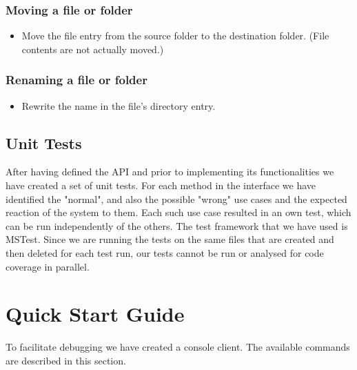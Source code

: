 \documentclass[11pt]{article}
\begin{document}
\subsubsection{Moving a file or folder}\label{moving-a-file-or-folder}
    \begin{itemize}
        \itemsep1pt\parskip0pt
        \item{Move the file entry from the source folder to the destination folder. (File contents are not actually moved.)}
    \end{itemize}

\subsubsection{Renaming a file or folder}\label{renaming-a-file-or-folder}
    \begin{itemize}
        \itemsep1pt\parskip0pt
        \item{Rewrite the name in the file's directory entry.}
    \end{itemize}

\subsection{Unit Tests}
After having defined the API and prior to implementing its functionalities we have created a set of unit tests. For each method in the interface we have identified the "normal", and also the possible "wrong" use cases and the expected reaction of the system to them. Each such use case resulted in an own test, which can be run independently of the others. The test framework that we have used is MSTest.\newline
Since we are running the tests on the same files that are created and then deleted for each test run, our tests cannot be run or analysed for code coverage in parallel.


\setcounter{section}{4}

\section{Quick Start Guide}
To facilitate debugging we have created a console client. The available commands are described in this section.
\end{document}
